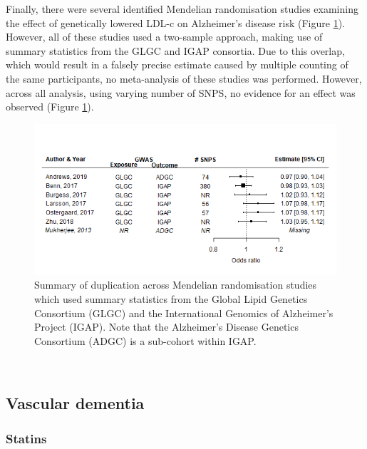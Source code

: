 \documentclass[a4paper, twoside]{templates/ociamthesis}
\begin{document}
Finally, there were several identified Mendelian randomisation studies examining the effect of genetically lowered LDL-c on Alzheimer's disease risk (Figure \ref{fig:mrDuplication}). However, all of these studies used a two-sample approach, making use of summary statistics from the GLGC and IGAP consortia. Due to this overlap, which would result in a falsely precise estimate caused by multiple counting of the same participants, no meta-analysis of these studies was performed. However, across all analysis, using varying number of SNPS, no evidence for an effect was observed (Figure \ref{fig:mrDuplication}).





\begin{figure}[H]

{\centering \includegraphics[width=0.8\linewidth]{figures/sys-rev/mrDuplication} 

}

\caption[Summary of duplication across two sample Mendelian randomisation studies]{Summary of duplication across Mendelian randomisation studies which used summary statistics from the Global Lipid Genetics Consortium (GLGC) and the International Genomics of Alzheimer's Project (IGAP). Note that the Alzheimer's Disease Genetics Consortium (ADGC) is a sub-cohort within IGAP.}\label{fig:mrDuplication}
\end{figure}

~

\hypertarget{sys-rev-res-VaD}{%
\subsection{Vascular dementia}\label{sys-rev-res-VaD}}

\hypertarget{statins-2}{%
\subsubsection{Statins}\label{statins-2}}
\end{document}
